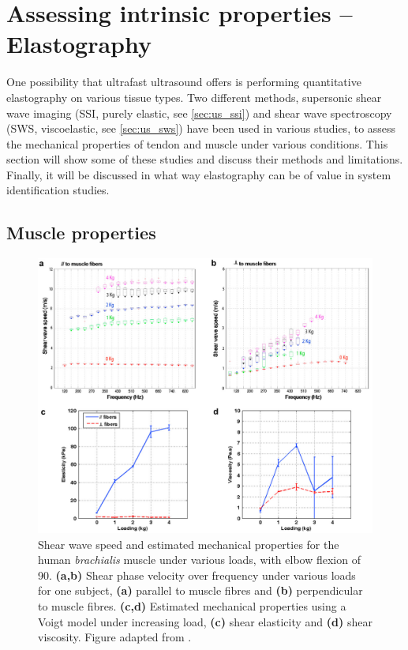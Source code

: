 \section{Assessing intrinsic properties -- Elastography}
One possibility that ultrafast ultrasound offers is performing quantitative elastography on various tissue types. Two different methods, supersonic shear wave imaging (SSI, purely elastic, see \autoref{sec:us_ssi}) and shear wave spectroscopy (SWS, viscoelastic, see \ref{sec:us_sws}) have been used in various studies, to assess the mechanical properties of tendon and muscle under various conditions. This section will show some of these studies and discuss their methods and limitations. Finally, it will be discussed in what way elastography can be of value in system identification studies. 



\subsection{Muscle properties}

\begin{figure}[t]
	\centering
	\includegraphics[width=.90\linewidth]{Figures/elastography/gennisson_dispersion2.png}
	\caption{Shear wave speed and estimated mechanical properties for the human \textit{brachialis} muscle under various loads, with elbow flexion of \SI{90}{\deg}. \textbf{(a,b)} Shear phase velocity over frequency under various loads for one subject, \textbf{(a)} parallel to muscle fibres and \textbf{(b)} perpendicular to muscle fibres. \textbf{(c,d)} Estimated mechanical properties using a Voigt model under increasing load, \textbf{(c)} shear elasticity and \textbf{(d)} shear viscosity. Figure adapted from \citet{gennisson_viscoelastic_2010}.}
	\label{fig:rem_gennisson_dispersion_force}
\end{figure}


